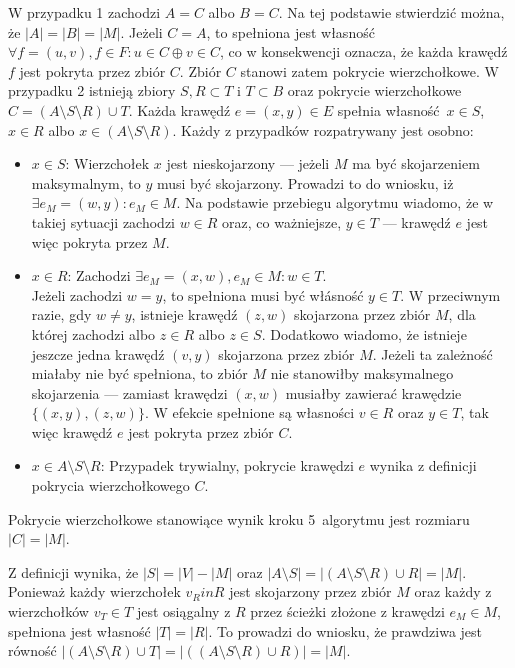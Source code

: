 \begin{bproof}
  W przypadku 1 zachodzi $A = C$ albo $B = C$.
  Na tej podstawie stwierdzić można, że ${|A|=|B|=|M|}$.
  Jeżeli $C = A$, to spełniona jest własność $\forall{f=(u,v), f\in F}: u \in C \oplus v \in C$, co
  w konsekwencji oznacza, że każda krawędź $f$ jest pokryta przez zbiór $C$.
  Zbiór $C$ stanowi zatem pokrycie wierzchołkowe.
  W przypadku 2 istnieją zbiory $S, R \subset T$ i $T \subset B$ oraz pokrycie wierzchołkowe $C=(A \setminus S \setminus R) \cup T$.
  Każda krawędź $e=(x, y) \in E$ spełnia własność $x \in S$, $x \in R$ albo $x \in (A \setminus S \setminus R)$.
  Każdy z przypadków rozpatrywany jest osobno:
  \begin{itemize}
    \item \underline{$x \in S$}: Wierzchołek $x$ jest nieskojarzony --- jeżeli $M$ ma być skojarzeniem maksymalnym, to $y$ musi być skojarzony.
      Prowadzi to do wniosku, iż $\exists{e_M=(w,y)}: e_M \in M$.
      Na podstawie przebiegu algorytmu wiadomo, że w takiej sytuacji zachodzi $w \in R$
      oraz, co ważniejsze, $y \in T$ --- krawędź $e$ jest więc pokryta przez $M$.
    \item \underline{$x \in R$}: Zachodzi $\exists{e_M=(x,w), e_M\in M}: w \in T$. \\
      Jeżeli zachodzi $w=y$, to spełniona musi być włásność $y \in T$.
      W przeciwnym razie, gdy $w \neq y$, istnieje krawędź $(z,w)$ skojarzona przez zbiór $M$, dla której zachodzi albo $z \in R$ albo $z \in S$.
      Dodatkowo wiadomo, że istnieje jeszcze jedna krawędź $(v, y)$ skojarzona przez zbiór $M$.
      Jeżeli ta zależność miałaby nie być spełniona, to zbiór $M$ nie stanowiłby maksymalnego skojarzenia --- zamiast krawędzi $(x,w)$ musiałby zawierać krawędzie $\{(x,y),(z,w)\}$.
      W efekcie spełnione są własności $v \in R$ oraz $y \in T$, tak więc krawędź $e$ jest pokryta przez zbiór $C$.
    \item \underline{$x \in A \setminus S \setminus R$}: Przypadek trywialny,
      pokrycie krawędzi $e$ wynika z definicji pokrycia wierzchołkowego $C$.
  \end{itemize}
\end{bproof}
\begin{theorem}
  Pokrycie wierzchołkowe stanowiące wynik kroku 5\ algorytmu jest rozmiaru $|C| = |M|$. 
\end{theorem}
\begin{bproof}
  Z definicji wynika, że $|S| = |V| - |M|$ oraz $|A \setminus S|=|(A \setminus S
  \setminus R) \cup R|=|M|$.\\
  Ponieważ każdy wierzchołek $v_R in R$ jest skojarzony przez zbiór $M$ oraz każdy z wierzchołków $v_T \in T$ jest osiągalny z $R$ przez ścieżki złożone z krawędzi $e_M \in M$, spełniona jest własność $|T|=|R|$.
  To prowadzi do wniosku, że prawdziwa jest równość $|(A\setminus S\setminus R)\cup T|=|((A \setminus S \setminus R) \cup R)|=|M|$.
\end{bproof}
